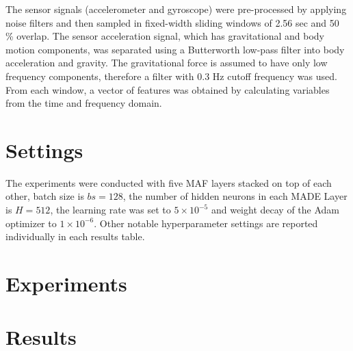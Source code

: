 \documentclass[11pt,titlepage,oneside,openany]{book}
\begin{document}
The sensor signals (accelerometer and gyroscope) were pre-processed by applying noise filters and then sampled in fixed-width sliding windows of 2.56 sec and 50 \% overlap. The sensor acceleration signal, which has gravitational and body motion components, was separated using a Butterworth low-pass filter into body acceleration and gravity. The gravitational force is assumed to have only low frequency components, therefore a filter with 0.3 Hz cutoff frequency was used. From each window, a vector of features was obtained by calculating variables from the time and frequency domain.


\section{Settings}
\label{sec:setting}
The experiments were conducted with five MAF layers stacked on top of each other, batch size is $bs = 128$, the number of hidden neurons in each MADE Layer is $H=512$, the learning rate was set to $5 \times 10^{-5}$ and weight decay of the Adam optimizer to $1 \times 10^{-6}$. Other notable hyperparameter settings are reported individually in each results table.


\section{Experiments}
\label{sec:exp}


\section{Results}
\label{sec:results}


%
%
\end{document}
